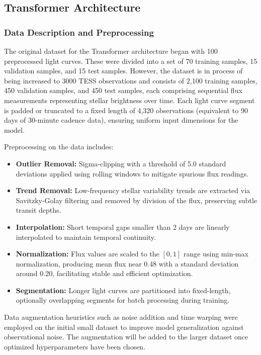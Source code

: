 \documentclass[letterpaper]{article} %
\begin{document}
\subsection{Transformer Architecture}

\subsubsection*{Data Description and Preprocessing}

The original dataset for the Transformer architecture began with 100 preprocessed light curves. These were divided into a set of 70 training samples, 15 validation samples, and 15 test samples. However, the dataset is in process of being increased to 3000 TESS observations and consists of 2,100 training samples, 450 validation samples, and 450 test samples, each comprising sequential flux measurements representing stellar brightness over time. Each light curve segment is padded or truncated to a fixed length of 4,320 observations (equivalent to 90 days of 30-minute cadence data), ensuring uniform input dimensions for the model.

Preprocessing on the data includes:

\begin{itemize}
    \item \textbf{Outlier Removal:} Sigma-clipping with a threshold of 5.0 standard deviations applied using rolling windows to mitigate spurious flux readings.
    \item \textbf{Trend Removal:} Low-frequency stellar variability trends are extracted via Savitzky-Golay filtering and removed by division of the flux, preserving subtle transit depths.
    \item \textbf{Interpolation:} Short temporal gaps smaller than 2 days are linearly interpolated to maintain temporal continuity.
    \item \textbf{Normalization:} Flux values are scaled to the \([0,1]\) range using min-max normalization, producing mean flux near 0.48 with a standard deviation around 0.20, facilitating stable and efficient optimization.
    \item \textbf{Segmentation:} Longer light curves are partitioned into fixed-length, optionally overlapping segments for batch processing during training.
\end{itemize}

Data augmentation heuristics such as noise addition and time warping were employed on the initial small dataset to improve model generalization against observational noise. The augmentation will be added to the larger dataset once optimized hyperparameters have been chosen.
\end{document}
